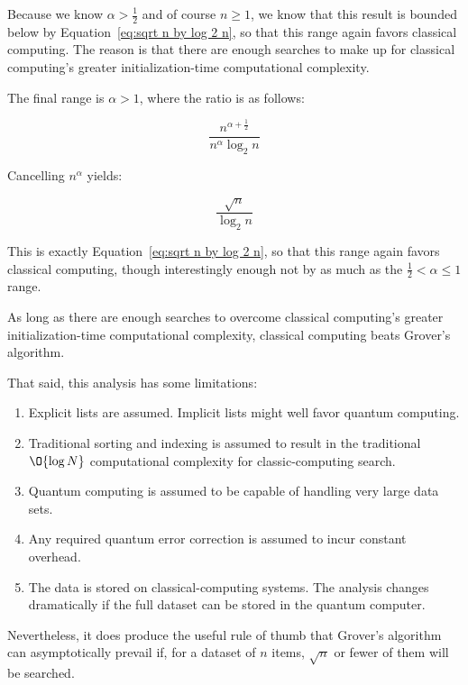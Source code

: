 Because we know $\alpha > \frac{1}{2}$ and of course $n \geq 1$,
we know that this result is bounded below by
Equation~\ref{eq:sqrt n by log 2 n}, so that this range again
favors classical computing.
The reason is that there are enough searches to make up for
classical computing's greater initialization-time computational
complexity.

The final range is $\alpha > 1$, where the ratio is as follows:

\begin{equation}
	\frac{n^{\alpha + \frac{1}{2}}}{n^\alpha \log_2 n}
\end{equation}

Cancelling $n^\alpha$ yields:

\begin{equation}
	\frac{\sqrt n}{\log_2 n}
\end{equation}

This is exactly
Equation~\ref{eq:sqrt n by log 2 n}, so that this range again
favors classical computing, though interestingly enough not by
as much as the 
$\frac{1}{2} < \alpha \leq 1$ range.

As long as there are enough searches to overcome classical computing's
greater initialization-time computational complexity, classical computing
beats Grover's algorithm.

That said, this analysis has some limitations:

\begin{enumerate}
\item	Explicit lists are assumed.
	Implicit lists might well favor quantum computing.
\item	Traditional sorting and indexing is assumed to result in
	the traditional $\O{\log N}$ computational complexity for
	classic-computing search.
\item	Quantum computing is assumed to be capable of handling
	very large data sets.
\item	Any required quantum error correction is assumed to incur
	constant overhead.
\item	The data is stored on classical-computing systems.
	The analysis changes dramatically if the full dataset
	can be stored in the quantum computer.
\end{enumerate}

Nevertheless, it does produce the useful rule of thumb that Grover's
algorithm can asymptotically prevail if, for a dataset of $n$ items,
$\sqrt n$ or fewer of them will be searched.

